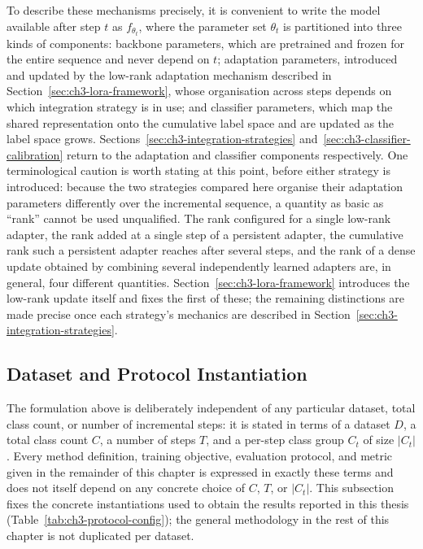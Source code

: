 To describe these mechanisms precisely, it is convenient to write the model
available after step $t$ as $f_{\theta_t}$, where the parameter set
$\theta_t$ is partitioned into three kinds of components: backbone
parameters, which are pretrained and frozen for the entire sequence and
never depend on $t$; adaptation parameters, introduced and updated by the
low-rank adaptation mechanism described in Section~\ref{sec:ch3-lora-framework}, whose organisation
across steps depends on which integration strategy is in use; and
classifier parameters, which map the shared representation onto the
cumulative label space and are updated as the label space grows. Sections~\ref{sec:ch3-integration-strategies}
and~\ref{sec:ch3-classifier-calibration} return to the adaptation and classifier components
respectively. One terminological caution is worth stating at this point,
before either strategy is introduced: because the two strategies compared
here organise their adaptation parameters differently over the incremental
sequence, a quantity as basic as ``rank'' cannot be used unqualified. The
rank configured for a single low-rank adapter, the rank added at a single
step of a persistent adapter, the cumulative rank such a persistent adapter
reaches after several steps, and the rank of a dense update obtained by
combining several independently learned adapters are, in general, four
different quantities. Section~\ref{sec:ch3-lora-framework} introduces the low-rank update itself and
fixes the first of these; the remaining distinctions are made precise once
each strategy's mechanics are described in Section~\ref{sec:ch3-integration-strategies}.

\subsection{Dataset and Protocol Instantiation}
\label{sec:ch3-protocol-instantiation}

The formulation above is deliberately independent of any particular
dataset, total class count, or number of incremental steps: it is stated
in terms of a dataset $D$, a total class count $C$, a number of steps $T$,
and a per-step class group $C_t$ of size $|C_t|$. Every method definition,
training objective, evaluation protocol, and metric given in the remainder
of this chapter is expressed in exactly these terms and does not itself
depend on any concrete choice of $C$, $T$, or $|C_t|$. This subsection
fixes the concrete instantiations used to obtain the results reported in
this thesis (Table~\ref{tab:ch3-protocol-config}); the general methodology
in the rest of this chapter is not duplicated per dataset.

